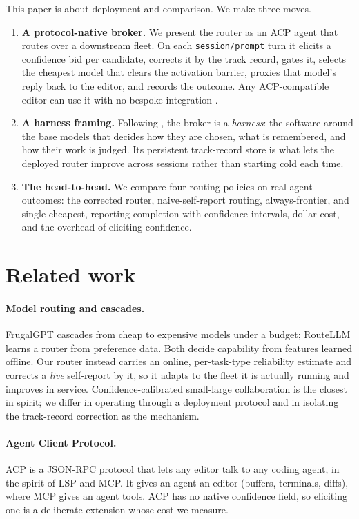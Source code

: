 \documentclass[11pt]{article}
\newcommand{\code}[1]{\texttt{#1}}
\begin{document}
This paper is about deployment and comparison. We make three moves.

\begin{enumerate}\itemsep2pt
\item \textbf{A protocol-native broker.} We present the router as an ACP agent that routes over a downstream fleet. On each \code{session/prompt} turn it elicits a confidence bid per candidate, corrects it by the track record, gates it, selects the cheapest model that clears the activation barrier, proxies that model's reply back to the editor, and records the outcome. Any ACP-compatible editor can use it with no bespoke integration \citep{acp2025}.
\item \textbf{A harness framing.} Following \citet{weng2026harness}, the broker is a \emph{harness}: the software around the base models that decides how they are chosen, what is remembered, and how their work is judged. Its persistent track-record store is what lets the deployed router improve across sessions rather than starting cold each time.
\item \textbf{The head-to-head.} We compare four routing policies on real agent outcomes: the corrected router, naive-self-report routing, always-frontier, and single-cheapest, reporting completion with confidence intervals, dollar cost, and the overhead of eliciting confidence.
\end{enumerate}

\section{Related work}

\paragraph{Model routing and cascades.} FrugalGPT \citep{chen2023frugalgpt} cascades from cheap to expensive models under a budget; RouteLLM \citep{ong2024routellm} learns a router from preference data. Both decide capability from features learned offline. Our router instead carries an online, per-task-type reliability estimate and corrects a \emph{live} self-report by it, so it adapts to the fleet it is actually running and improves in service. Confidence-calibrated small-large collaboration \citep{zhang2026confidence} is the closest in spirit; we differ in operating through a deployment protocol and in isolating the track-record correction as the mechanism.

\paragraph{Agent Client Protocol.} ACP \citep{acp2025} is a JSON-RPC protocol that lets any editor talk to any coding agent, in the spirit of LSP and MCP. It gives an agent an editor (buffers, terminals, diffs), where MCP gives an agent tools. ACP has no native confidence field, so eliciting one is a deliberate extension whose cost we measure.
\end{document}
